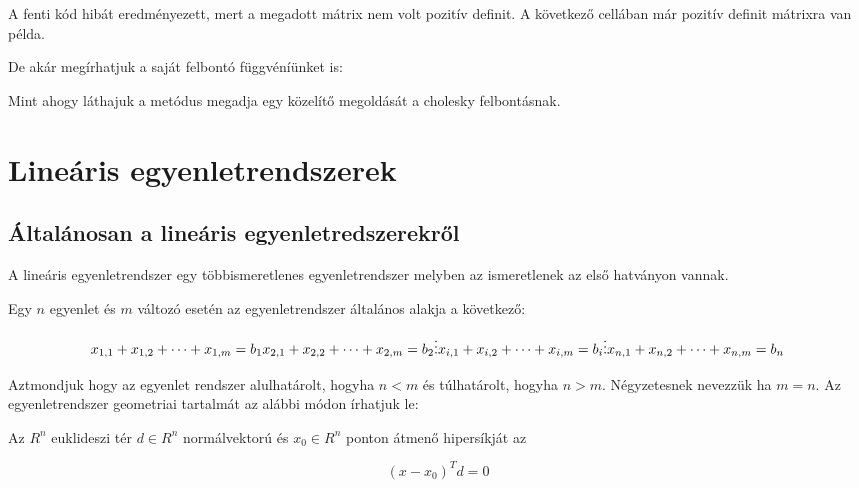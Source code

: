     A fenti kód hibát eredményezett, mert a megadott mátrix nem volt pozitív
definit. A következő cellában már pozitív definit mátrixra van példa.

    \begin{python}

\end{python}

    De akár megírhatjuk a saját felbontó függvéníünket is:

   \begin{python}

\end{python}

    Mint ahogy láthajuk a metódus megadja egy közelítő megoldását a cholesky
felbontásnak.

\section{Lineáris
egyenletrendszerek}\label{lineuxe1ris-egyenletrendszerek}

    \subsection{Általánosan a lineáris
egyenletredszerekről}\label{uxe1ltaluxe1nosan-a-lineuxe1ris-egyenletredszerekrux151l}

    A lineáris egyenletrendszer egy többismeretlenes egyenletrendszer
melyben az ismeretlenek az első hatványon vannak.

    Egy \(n\) egyenlet és \(m\) változó esetén az egyenletrendszer általános
alakja a következő:

    \[
x_{1,1} + x_{1,2} + \dots + x_{1,m} = b_{1}\\
x_{2,1} + x_{2,2} + \dots + x_{2,m} = b_{2}\\
\vdots\\
x_{i,1} + x_{i,2} + \dots + x_{i,m} = b_{i}\\
\vdots\\
x_{n,1} + x_{n,2} + \dots + x_{n,m} = b_{n}\\
\]

    Aztmondjuk hogy az egyenlet rendszer alulhatárolt, hogyha \(n<m\) és
túlhatárolt, hogyha \(n>m\). Négyzetesnek nevezzük ha \(m=n\). Az
egyenletrendszer geometriai tartalmát az alábbi módon írhatjuk le:

    Az \(R^n\) euklideszi tér \(d\in R^n\) normálvektorú és \(x_0 \in R^n\)
ponton átmenő hipersíkját az

\[ (x - x_0)^Td=0\]

